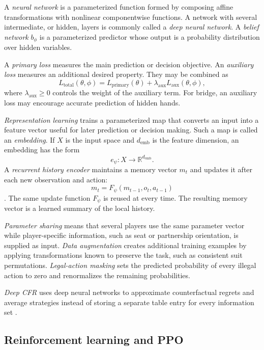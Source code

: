 A \emph{neural network} is a parameterized function formed by composing affine transformations with nonlinear componentwise functions. A network with several intermediate, or hidden, layers is commonly called a \emph{deep neural network}. A \emph{belief network} $b_\phi$ is a parameterized predictor whose output is a probability distribution over hidden variables.

A \emph{primary loss} measures the main prediction or decision objective. An \emph{auxiliary loss} measures an additional desired property. They may be combined as
\[
    L_{\mathrm{total}}(\theta,\phi)
    =
    L_{\mathrm{primary}}(\theta)
    +
    \lambda_{\mathrm{aux}} L_{\mathrm{aux}}(\theta,\phi),
\]
where $\lambda_{\mathrm{aux}}\geq0$ controls the weight of the auxiliary term. For bridge, an auxiliary loss may encourage accurate prediction of hidden hands.

\emph{Representation learning} trains a parameterized map that converts an input into a feature vector useful for later prediction or decision making. Such a map is called an \emph{embedding}. If $X$ is the input space and $d_{\mathrm{emb}}$ is the feature dimension, an embedding has the form
\[
    e_\psi:X\to\mathbb{R}^{d_{\mathrm{emb}}}.
\]
A \emph{recurrent history encoder} maintains a memory vector $m_t$ and updates it after each new observation and action:
\[
    m_t=F_\psi(m_{t-1},o_t,a_{t-1})
\].
The same update function $F_\psi$ is reused at every time. The resulting memory vector is a learned summary of the local history.

\emph{Parameter sharing} means that several players use the same parameter vector while player-specific information, such as seat or partnership orientation, is supplied as input. \emph{Data augmentation} creates additional training examples by applying transformations known to preserve the task, such as consistent suit permutations. \emph{Legal-action masking} sets the predicted probability of every illegal action to zero and renormalizes the remaining probabilities.

\emph{Deep CFR} uses deep neural networks to approximate counterfactual regrets and average strategies instead of storing a separate table entry for every information set \cite{brown2019deep}.


\subsection{Reinforcement learning and PPO}
\label{app:reinforcement-learning}

